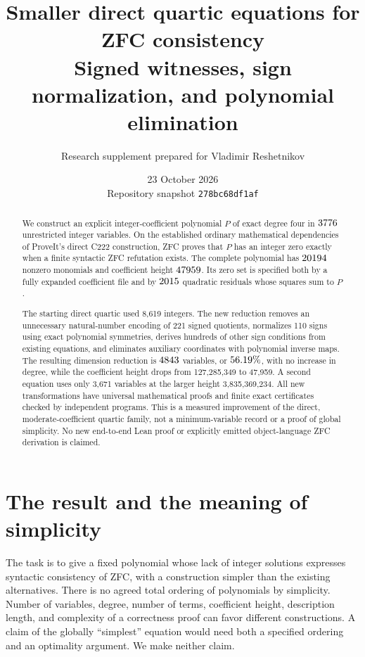 \documentclass[11pt,letterpaper]{article}
\title{Smaller direct quartic equations for ZFC consistency\\[0.3em]\large Signed witnesses, sign normalization, and polynomial elimination}
\author{Research supplement prepared for Vladimir Reshetnikov}
\date{23 October 2026\\\small Repository snapshot \texttt{278bc68df1af}}
\theoremstyle{definition}
\begin{document}
\maketitle
\begin{abstract}
We construct an explicit integer-coefficient polynomial $P$ of exact degree
four in $3776$ unrestricted integer variables. On the established
ordinary mathematical dependencies of ProveIt's direct C222 construction,
ZFC proves that $P$ has an integer zero exactly when a finite syntactic ZFC
refutation exists. The complete polynomial has $20194$ nonzero
monomials and coefficient height $47959$. Its zero set is specified
both by a fully expanded coefficient file and by $2015$ quadratic
residuals whose squares sum to $P$.

The starting direct quartic used 8,619 integers. The new reduction removes
an unnecessary natural-number encoding of 221 signed quotients, normalizes
110 signs using exact polynomial symmetries, derives hundreds of other
sign conditions from existing equations, and eliminates auxiliary
coordinates with polynomial inverse maps. The resulting dimension
reduction is $4843$ variables, or $56.19\%$, with no increase
in degree, while the coefficient height drops from 127,285,349 to
47,959. A second equation uses only 3,671 variables at the larger height
3,835,369,234. All new transformations have universal
mathematical proofs and finite exact certificates checked by independent
programs. This is a measured improvement of the direct, moderate-coefficient
quartic family, not a minimum-variable record or a proof of global
simplicity. No new end-to-end Lean proof or explicitly emitted
object-language ZFC derivation is claimed.
\end{abstract}

\tableofcontents
\newpage

\section{The result and the meaning of simplicity}
\label{sec:result}

The task is to give a fixed polynomial whose lack of integer solutions
expresses syntactic consistency of ZFC, with a construction simpler than
the existing alternatives. There is no agreed total ordering of
polynomials by simplicity. Number of variables, degree, number of terms,
coefficient height, description length, and complexity of a correctness
proof can favor different constructions. A claim of the globally
``simplest'' equation would need both a specified ordering and an
optimality argument. We make neither claim.
\end{document}
